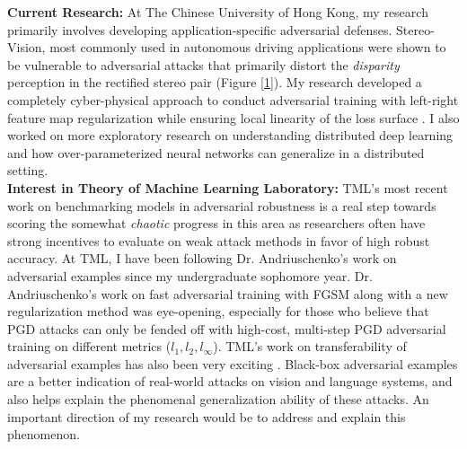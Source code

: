 \documentclass[12pt]{article}
\begin{document}
\textbf{Current Research:} At The Chinese University of Hong Kong, my research primarily involves developing application-specific adversarial defenses. Stereo-Vision, most commonly used in autonomous driving applications were shown to be vulnerable to adversarial attacks that primarily distort the \emph{disparity} perception in the rectified stereo pair (Figure \ref{1}). My research developed a completely cyber-physical approach to conduct adversarial training with left-right feature map regularization while ensuring local linearity of the loss surface \cite{me}. I also worked on more exploratory research on understanding distributed deep learning and how over-parameterized neural networks can generalize in a distributed setting. \\

\textbf{Interest in Theory of Machine Learning Laboratory: } TML's most recent work on benchmarking models in adversarial robustness is a real step towards scoring the somewhat \emph{chaotic} progress in this area as researchers often have strong incentives to evaluate on weak attack methods in favor of high robust accuracy. At TML, I have been following Dr. Andriuschenko's work on adversarial examples since my undergraduate sophomore year. Dr. Andriuschenko's work on fast adversarial training with FGSM along with a new regularization method was eye-opening, especially for those who believe that PGD attacks can only be fended off with high-cost, multi-step PGD adversarial training on different metrics ($l_{1},l_{2},l_{\infty}$). TML's work on transferability of adversarial examples has also been very exciting \cite{Croce:278915,Andriushchenko:273123}. Black-box adversarial examples are a better indication of real-world attacks on vision and language systems, and also helps explain the phenomenal generalization ability of these attacks. An important direction of my research would be to address and explain this phenomenon. \\
\end{document}

